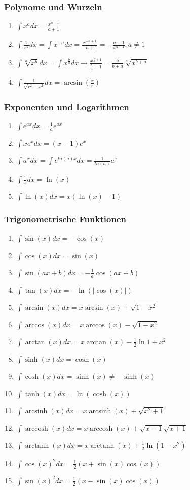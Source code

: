\documentclass[a4paper, 9pt, DIV=24]{scrartcl}
\DeclareMathOperator{\arcsinh}{arcsinh}
\DeclareMathOperator{\arccosh}{arccosh}
\DeclareMathOperator{\arctanh}{arctanh}
\begin{document}
\subsubsection{Polynome und Wurzeln}
\begin{enumerate}[label={(}\arabic*{)}]
 \item $\int x^a dx = \frac{x^{a+1}}{a+1}$
 \item $\int \frac{1}{x^a} dx = \int x^{-a} dx = \frac{x^{-a+1}}{-a+1} = -\frac{a-1}{x^{a-1}}, a \neq 1$
 \item $\int \sqrt[a]{x^b} dx = \int x^{\frac{b}{a}} dx \rightarrow \frac{x^{\frac{b}{a}+1}}{\frac{b}{a}+1} = \frac{a}{b+a}\sqrt[a]{x^{b+a}}$
 \item $\int \frac{1}{\sqrt{r^2-x^2}} dx = \arcsin \left(\frac{x}{r}\right)$
\end{enumerate}
\subsubsection{Exponenten und Logarithmen}
\begin{enumerate}[label={(}\arabic*{)}]
 \item $\int e^{ax} dx = \frac{1}{a}e^{ax}$
 \item $\int xe^{x} dx = (x-1)e^{x}$
 \item $\int a^{x} dx = \int e^{ln(a)x} dx = \frac{1}{ln(a)}a^x$
 \item $\int \frac{1}{x} dx = \ln(x)$
 \item $\int \ln(x) dx = x(\ln(x)-1)$
\end{enumerate}
\subsubsection{Trigonometrische Funktionen}
\begin{enumerate}[label={(}\arabic*{)}]
 \item $\int \sin(x) dx = -\cos(x)$
 \item $\int \cos(x) dx = \sin(x)$
 \item $\int \sin(ax+b) dx = -\frac{1}{a}\cos(ax+b)$
 \item $\int \tan(x) dx = -\ln(|\cos(x)|)$
 \item $\int \arcsin(x) dx = x\arcsin(x) + \sqrt{1-x^2}$
 \item $\int \arccos(x) dx = x\arccos(x) - \sqrt{1-x^2}$
 \item $\int \arctan(x) dx = x\arctan(x) - \frac{1}{2}\ln{1+x^2}$
 \item $\int \sinh(x) dx = \cosh(x)$
 \item $\int \cosh(x) dx = \sinh(x) \neq -\sinh(x)$
 \item $\int \tanh(x) dx = \ln(\cosh(x))$
 \item $\int \arcsinh(x) dx = x\arcsinh(x) + \sqrt{x^2+1}$
 \item $\int \arccosh(x) dx = x\arccosh(x) + \sqrt{x-1}\sqrt{x+1}$
 \item $\int \arctanh(x) dx = x\arctanh(x) + \frac{1}{2}\ln(1-x^2)$
 \item $\int \cos(x)^2 dx = \frac{1}{2} (x+\sin(x)\cos(x))$
 \item $\int \sin(x)^2 dx = \frac{1}{2} (x-\sin(x)\cos(x))$
\end{enumerate}
\end{document}
